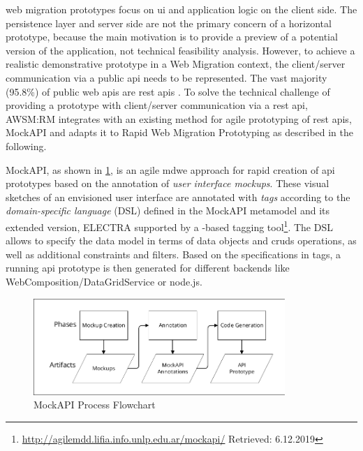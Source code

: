 \Glspl{web migration prototype} focus on \gls{ui} and application logic on the client side.
The persistence layer and server side are not the primary concern of a horizontal prototype, because the main motivation is to provide a preview of a potential \webbased version of the \legacy application, not technical feasibility analysis.
However, to achieve a realistic demonstrative prototype in a \gls{Web Migration} context, the client/server communication via a public \gls{api} needs to be represented.
The vast majority (95.8\%) of public \gls{web} \glspl{api} are \gls{rest} \glspl{api} \autocite{Neumann2018PublicApis}.
To solve the technical challenge of providing a prototype with client/server communication via a \gls{rest} \gls{api}, AWSM:RM integrates with an existing method for agile prototyping of \gls{rest} \glspl{api}, MockAPI \autocite{Rivero2013,Rivero2014Electra} and adapts it to \gls{Rapid Web Migration Prototyping} as described in the following.

MockAPI, as shown in \cref{fig:awsm.rm.mockapi.process}, is an agile \gls{mdwe} approach for rapid creation of  \gls{api} prototypes based on the annotation of \emph{user interface mockups}.
These visual sketches of an envisioned user interface are annotated with \emph{tags} according to the \emph{domain-specific language} (DSL) defined in the MockAPI \gls{metamodel} \autocite{Rivero2013} and its extended version, ELECTRA \autocite{Rivero2014Electra} supported by a -based tagging tool\footnote{\url{http://agilemdd.lifia.info.unlp.edu.ar/mockapi/} Retrieved: 6.12.2019}.
The DSL allows to specify the data model in terms of data objects and \gls{cruds} operations, as well as additional constraints and filters.
Based on the specifications in tags, a running  \gls{api} prototype is then generated for different backends like WebComposition/DataGridService \autocite{Chudnovskyy2010DGS} or node.js.
\begin{figure}[h!]
\hypertarget{fig:awsm.rm.mockapi.process}{%
\centering
\includegraphics[width=0.85\textwidth]{../figures/mockapi-flowchart.pdf}
\caption{MockAPI Process Flowchart}\label{fig:awsm.rm.mockapi.process}
}
\end{figure}


